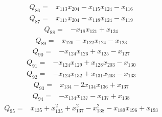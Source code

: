 \begin{equation*}\begin{aligned}
Q_{86}={}& x_{113}x_{204}-x_{115}x_{124}-x_{116}
\end{aligned}\end{equation*}
\begin{equation*}\begin{aligned}
Q_{87}={}& x_{117}x_{204}-x_{118}x_{124}-x_{119}
\end{aligned}\end{equation*}
\begin{equation*}\begin{aligned}
Q_{88}={}& -x_{18}x_{121}+x_{124}
\end{aligned}\end{equation*}
\begin{equation*}\begin{aligned}
Q_{89}={}& x_{120}-x_{122}x_{124}-x_{123}
\end{aligned}\end{equation*}
\begin{equation*}\begin{aligned}
Q_{90}={}& -x_{124}x_{126}+x_{125}-x_{127}
\end{aligned}\end{equation*}
\begin{equation*}\begin{aligned}
Q_{91}={}& -x_{124}x_{129}+x_{128}x_{203}-x_{130}
\end{aligned}\end{equation*}
\begin{equation*}\begin{aligned}
Q_{92}={}& -x_{124}x_{132}+x_{131}x_{203}-x_{133}
\end{aligned}\end{equation*}
\begin{equation*}\begin{aligned}
Q_{93}={}& x_{134}-2x_{134}x_{136}+x_{137}
\end{aligned}\end{equation*}
\begin{equation*}\begin{aligned}
Q_{94}={}& -x_{134}x_{137}-x_{137}+x_{138}
\end{aligned}\end{equation*}
\begin{equation*}\begin{aligned}
Q_{95}={}& x_{135}+x_{135}^{2}+x_{137}^{2}-x_{138}^{2}-x_{189}x_{196}+x_{193}
\end{aligned}\end{equation*}
